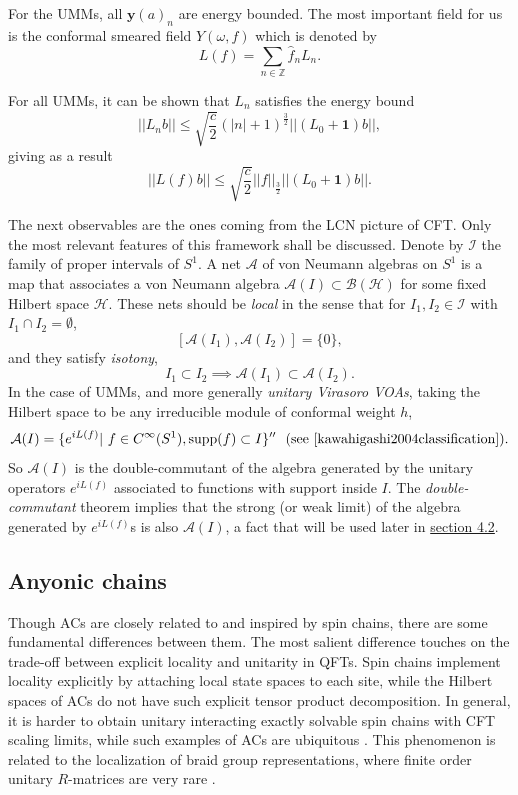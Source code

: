 \documentclass[twoside,11pt,titlepage]{amsart}
\renewcommand{\=}[1]{\stackrel{#1}{=}} %
\theoremstyle{definition}
\theoremstyle{remark}
\begin{document}
For the UMMs, all $\textbf{y}(a)_n$ are energy bounded. The most important field for us is the conformal smeared field $Y(\omega,f)$ which is denoted by 
$$L(f)=\sum_{n \in \mathbb{Z}} \hat{f}_nL_n.$$

For all UMMs, it can be shown that $L_n$ satisfies the energy bound
$$||L_nb|| \le \sqrt{\frac{c}{2}}(|n|+1)^\frac{3}{2}||(L_0+\textbf{1})b||,$$
giving as a result
$$||L(f)b||\le \sqrt{\frac{c}{2}} ||f||_{\frac{3}{2}}||(L_0+\textbf{1})b||.$$

The next observables are the ones coming from the LCN picture of CFT. Only the most relevant features of this framework shall be discussed. Denote by $\mathcal{I}$ the family of proper intervals
of $S^1$. A net $\mathcal{A}$ of von Neumann algebras on $S^1$ is a map that associates a von Neumann algebra $\mathcal{A}(I) \subset \mathcal{B}(\mathcal{H})$ for some fixed Hilbert space $\mathcal{H}$. These nets should be \textit{local} in the sense that for $I_1,I_2 \in \mathcal{I}$ with $I_1 \cap I_2=\emptyset$,
$$[\mathcal{A}(I_1),\mathcal{A}(I_2)]=\{0\},$$
and they satisfy \textit{isotony}, 
$$I_1 \subset I_2 \implies \mathcal{A}(I_1) \subset \mathcal{A}(I_2).$$
In the case of UMMs, and more generally \textit{unitary Virasoro VOAs}, taking the Hilbert space to be any irreducible module of conformal weight $h$,
$$\mathcal{A}(I)=\{e^{iL(f)}| \ f \in C^\infty(S^1), \text{supp}(f) \subset I\}'' \ \ (\text{see \cite{kawahigashi2004classification}}).$$
So $\mathcal{A}(I)$ is the double-commutant of the algebra generated by the unitary operators $e^{iL(f)}$ associated to functions with support inside $I$. The \textit{double-commutant} theorem implies that the strong (or weak limit) of the algebra generated by $e^{iL(f)}$s is also $\mathcal{A}(I)$, a fact that will be used later in \hyperref[4.2]{section 4.2}. 


\subsection{Anyonic chains}\label{1.4}

\hfill \break
Though ACs are closely related to and inspired by spin chains, there are some fundamental differences between them.  The most salient difference touches on the trade-off between explicit locality and unitarity in QFTs.  Spin chains implement locality explicitly by attaching local state spaces to each site, while the Hilbert spaces of ACs do not have such explicit tensor product decomposition.  In general, it is harder to obtain unitary interacting exactly solvable spin chains with CFT scaling limits, while such examples of ACs are ubiquitous \cite{feiguin2007interacting}.  This phenomenon is related to the localization of braid group representations, where finite order unitary $R$-matrices are very rare \cite{RW12}.
\end{document}
